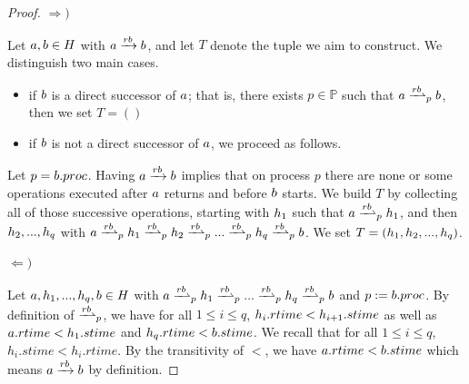\begin{proof}\slshape
$\Rightarrow)$

Let $a,b \in H$ with $a\xrightarrow{rb}b$, and let $T$ denote the tuple we aim to construct. We distinguish two main cases.
\begin{itemize}
	\item[$\ast$] if $b$ is a direct successor of $a$; that is, there exists $p \in \mathbb{P}$ such that $\opa\dsucp{p}\opb$, then we set $T=()$
	\item[$\ast$]  if $b$ is not a direct successor of $a$, we proceed as follows.
\end{itemize}

Let $p=b.proc$. Having $a\xrightarrow{rb}b$ implies that on process $p$ there are none or some operations executed after $a$ returns and before $b$ starts. We build $T$ by collecting all of those successive operations, starting with $h_1$ such that \mbox{$\opa\dsucp{p}\oph_1$}, and then $h_2,...,h_q$ with 
\mbox{$\opa\dsucp{p} \oph_1 \dsucp{p} \oph_2 \dsucp{p} ... \dsucp{p} \oph_q \dsucp{p} \opb$}. We set $T=(h_1,h_2,...,h_q)$.

$\Leftarrow)$

Let $a,h_1,...,h_q,b \in H$ with 
\mbox{$\opa \dsucp{p} \oph_1 \dsucp{p} ... \dsucp{p} \oph_q \dsucp{p} \opb$} and  $p:=b.proc$. By definition of $\dsucp{p}$, we have for all \mbox{$1 \leq i \leq q$}, $h_i.rtime<h_{i+1}.stime$ as well as \mbox{$a.rtime<h_1.stime$} and \mbox{$h_q.rtime<b.stime$}. We recall that for all \mbox{$1 \leq i \leq q$}, $h_i.stime<h_i.rtime$. By the transitivity of $<$, we have $a.rtime<b.stime$ which means $a \xrightarrow{rb}b$ by definition.

\end{proof}

